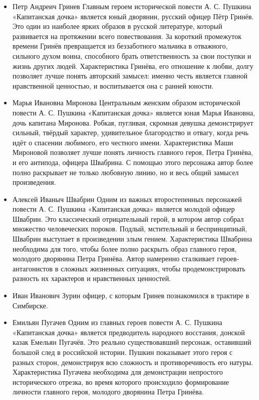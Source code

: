\documentclass[a4paper,12pt]{article}
\begin{document}
\begin{itemize}
  \item Петр Андреич Гринев
Главным героем исторической повести А. С. Пушкина «Капитанская дочка» является юный дворянин, русский офицер Пётр Гринёв. Это один из наиболее ярких образов в русской литературе, который развивается на протяжении всего повествования. За короткий промежуток времени Гринёв превращается из беззаботного мальчика в отважного, сильного духом воина, способного брать ответственность за свои поступки и жизнь других людей. Характеристика Гринёва, его отношение к любви, долгу позволяет лучше понять авторский замысел: именно честь является главной нравственной ценностью, и воспитывается она с ранней юности.
  \item Марья Ивановна Миронова
Центральным женским образом исторической повести А. С. Пушкина «Капитанская дочка» является юная Марья Ивановна, дочь капитана Миронова. Робкая, пугливая, скромная девушка демонстрирует сильный, твёрдый характер, удивительное благородство и отвагу, когда речь идёт о спасении любимого, его честного имени. Характеристика Маши Мироновой позволяет лучше понять личность главного героя, Петра Гринёва, и его антипода, офицера Швабрина. С помощью этого персонажа автор более полно раскрывает не только любовную линию, но и весь общий замысел произведения.
  \item Алексей Иваныч Швабрин
Одним из важных второстепенных персонажей повести А. С. Пушкина «Капитанская дочка» является молодой офицер Швабрин. Это классический отрицательный герой, в котором автор собрал множество человеческих пороков. Подлый, мстительный и беспринципный, Швабрин выступает в произведении злым гением. Характеристика Швабрина необходима для того, чтобы более полно раскрыть образ главного героя, молодого дворянина Петра Гринёва. Автор намеренно сталкивает героев-антагонистов в сложных жизненных ситуациях, чтобы продемонстрировать разность их характеров и нравственных ценностей.
\item Иван Иванович Зурин 
офицер, с которым Гринев познакомился в трактире в Симбирске.
\item Емильян Пугачев
Одним из главных героев повести А. С. Пушкина «Капитанская дочка» является предводитель народного восстания, донской казак Емельян Пугачёв. Это реально существовавший персонаж, оставивший большой след в российской истории. Пушкин показывает этого героя с разных сторон, демонстрируя всю сложность и противоречивость его натуры. Характеристика Пугачева необходима для демонстрации непростого исторического отрезка, во время которого происходило формирование личности главного героя, молодого дворянина Петра Гринёва.

\end{itemize}
\end{document}
